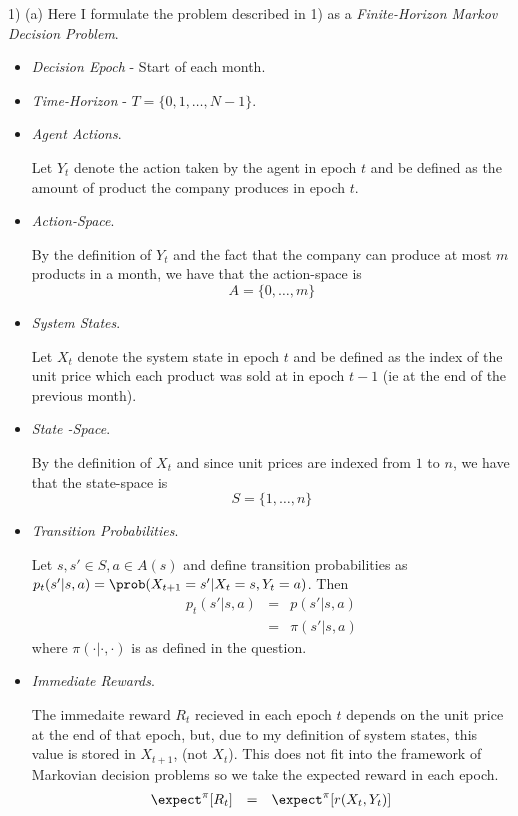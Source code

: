 \documentclass[11pt,a4paper]{article}
\begin{document}
\begin{answer}{1) (a)}
  Here I formulate the problem described in 1) as a \textit{Finite-Horizon Markov Decision Problem}.
  \begin{itemize}
    \item \textit{Decision Epoch} - Start of each month.
    \item \textit{Time-Horizon} - $T=\{0,1,\dots,N-1\}$.
    \item \textit{Agent Actions}.
    \par Let $Y_t$ denote the action taken by the agent in epoch $t$ and be defined as the amount of product the company produces in epoch $t$.
    \item \textit{Action-Space}.
    \par By the definition of $Y_t$ and the fact that the company can produce at most $m$ products in a month, we have that the action-space is
    \[ A=\{0,\dots,m\} \]
    \item \textit{System States}.
    \par Let $X_t$ denote the system state in epoch $t$ and be defined as the index of the unit price which each product was sold at in epoch $t-1$ (ie at the end of the previous month).
    \item \textit{State -Space}.
    \par By the definition of $X_t$ and since unit prices are indexed from $1$ to $n$, we have that the state-space is
    \[ S=\{1,\dots,n\} \]
    \item \textit{Transition Probabilities}.
    \par Let $s,s'\in S,a\in A(s)$ and define transition probabilities as $p_t(s'|s,a)=\prob(X_{t+1}=s'|X_t=s,Y_t=a)$. Then
    \[\begin{array}{rcl}
      p_t(s'|s,a)&=&p(s'|s,a)\\
      &=&\pi(s'|s,a)
    \end{array}\]
    where $\pi(\cdot|\cdot,\cdot)$ is as defined in the question.
    \item \textit{Immediate Rewards}.
    \par The immedaite reward $R_t$ recieved in each epoch $t$ depends on the unit price at the end of that epoch, but, due to my definition of system states, this value is stored in $X_{t+1}$, (not $X_t$). This does not fit into the framework of Markovian decision problems so we take the expected reward in each epoch.
    \[\begin{array}{rcl}
      \expect^\pi[R_t]&=&\expect^\pi[r(X_t,Y_t)]\\

\end{array}\]
\end{itemize}
\end{answer}
\end{document}
